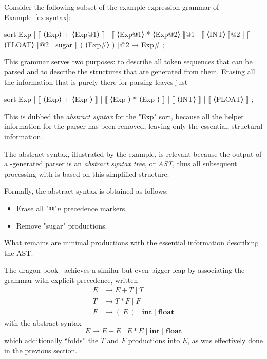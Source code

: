 \documentclass[11pt]{article} %
\begin{document}
\begin{example}\label{ex:ast}%
  Consider the following subset of the example expression grammar of Example~\ref{ex:syntax}:
  \begin{hacs}[xleftmargin=\parindent]
sort Exp  | ⟦ ⟨Exp⟩ + ⟨Exp@1⟩ ⟧
           | ⟦ ⟨Exp@1⟩ * ⟨Exp@2⟩ ⟧@1
           | ⟦ ⟨INT⟩ ⟧@2
           | ⟦ ⟨FLOAT⟩ ⟧@2
           | sugar ⟦ ( ⟨Exp#⟩ ) ⟧@2 → Exp# ;
  \end{hacs}
  This grammar serves two purposes: to describe all token sequences that can be parsed and to
  describe the structures that are generated from them. Erasing all the information that is purely
  there for parsing leaves just
  \begin{hacs}[xleftmargin=\parindent]
sort Exp  | ⟦ ⟨Exp⟩ + ⟨Exp  ⟩ ⟧
           | ⟦ ⟨Exp  ⟩ * ⟨Exp  ⟩ ⟧
           | ⟦ ⟨INT⟩ ⟧
           | ⟦ ⟨FLOAT⟩ ⟧ ;
  \end{hacs}
  This is dubbed the \emph{abstract syntax} for the "Exp" sort, because all the helper information
  for the parser has been removed, leaving only the essential, structural information.
\end{example}

The abstract syntax, illustrated by the example, is relevant because the output of a \HAX-generated
parser is an \emph{abstract syntax tree}, or \emph{AST}, thus all subsequent processing with \HAX is
based on this simplified structure.

Formally, the abstract syntax is obtained as follows:
\begin{itemize}
\item Erase all "@"$n$ precedence markers.
\item Remove "sugar" productions.
\end{itemize}
What remains are minimal productions with the essential information describing the AST.

\begin{remark}%
  The dragon book~\cite{Aho+:2006} achieves a similar but even bigger leap by associating the
  grammar with explicit precedence, written
  \begin{align*}
    E &→ E+T \mid T \\
    T &→ T*F \mid F \\
    F &→ (~E~) \mid \textbf{int} \mid \textbf{float}
  \end{align*}
  with the abstract syntax
  \begin{displaymath}
    E → E+E \mid E*E \mid \textbf{int} \mid \textbf{float}
  \end{displaymath}
  which additionally ``folds'' the $T$ and $F$ productions into $E$, as was effectively done in
  the previous section.
\end{remark}
\end{document}
